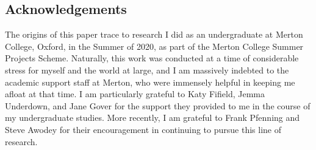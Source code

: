 \documentclass[
  12pt]{article}
\begin{document}
\subsection{Acknowledgements}\label{acknowledgements}

The origins of this paper trace to research I did as an undergraduate at
Merton College, Oxford, in the Summer of 2020, as part of the Merton
College Summer Projects Scheme. Naturally, this work was conducted at a
time of considerable stress for myself and the world at large, and I am
massively indebted to the academic support staff at Merton, who were
immensely helpful in keeping me afloat at that time. I am particularly
grateful to Katy Fifield, Jemma Underdown, and Jane Gover for the
support they provided to me in the course of my undergraduate studies.
More recently, I am grateful to Frank Pfenning and Steve Awodey for
their encouragement in continuing to pursue this line of research.
\end{document}
